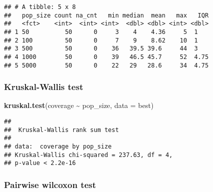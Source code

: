 \documentclass[
]{book}
\newenvironment{Shaded}{\begin{snugshade}}{\end{snugshade}}
\newcommand{\AttributeTok}[1]{\textcolor[rgb]{0.13,0.29,0.53}{#1}}
\newcommand{\ConstantTok}[1]{\textcolor[rgb]{0.56,0.35,0.01}{#1}}
\newcommand{\DecValTok}[1]{\textcolor[rgb]{0.00,0.00,0.81}{#1}}
\newcommand{\FunctionTok}[1]{\textcolor[rgb]{0.13,0.29,0.53}{\textbf{#1}}}
\newcommand{\NormalTok}[1]{#1}
\newcommand{\OtherTok}[1]{\textcolor[rgb]{0.56,0.35,0.01}{#1}}
\newcommand{\SpecialCharTok}[1]{\textcolor[rgb]{0.81,0.36,0.00}{\textbf{#1}}}
\newcommand{\StringTok}[1]{\textcolor[rgb]{0.31,0.60,0.02}{#1}}
\begin{document}
\begin{verbatim}
## # A tibble: 5 x 8
##   pop_size count na_cnt   min median  mean   max   IQR
##   <fct>    <int>  <int> <int>  <dbl> <dbl> <int> <dbl>
## 1 50          50      0     3    4    4.36     5  1   
## 2 100         50      0     7    9    8.62    10  1   
## 3 500         50      0    36   39.5 39.6     44  3   
## 4 1000        50      0    39   46.5 45.7     52  4.75
## 5 5000        50      0    22   29   28.6     34  4.75
\end{verbatim}

\hypertarget{kruskal-wallis-test-6}{%
\subsubsection{Kruskal-Wallis test}\label{kruskal-wallis-test-6}}

\begin{Shaded}
\begin{Highlighting}[]
\FunctionTok{kruskal.test}\NormalTok{(coverage }\SpecialCharTok{\textasciitilde{}}\NormalTok{ pop\_size, }\AttributeTok{data =}\NormalTok{ best)}
\end{Highlighting}
\end{Shaded}

\begin{verbatim}
## 
##  Kruskal-Wallis rank sum test
## 
## data:  coverage by pop_size
## Kruskal-Wallis chi-squared = 237.63, df = 4,
## p-value < 2.2e-16
\end{verbatim}

\hypertarget{pairwise-wilcoxon-test-6}{%
\subsubsection{Pairwise wilcoxon test}\label{pairwise-wilcoxon-test-6}}

\begin{Shaded}
\end{Shaded}
\end{document}
